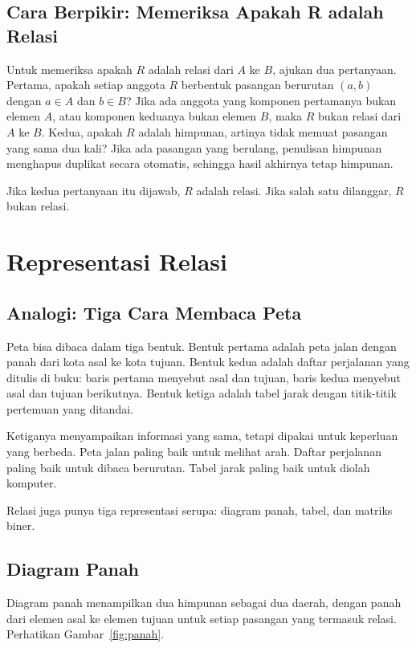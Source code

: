 \documentclass[11pt,a4paper]{article}
\begin{document}
\subsection{Cara Berpikir: Memeriksa Apakah R adalah Relasi}

Untuk memeriksa apakah $R$ adalah relasi dari $A$ ke $B$, ajukan dua pertanyaan. Pertama, apakah setiap anggota $R$ berbentuk pasangan berurutan $(a,b)$ dengan $a \in A$ dan $b \in B$? Jika ada anggota yang komponen pertamanya bukan elemen $A$, atau komponen keduanya bukan elemen $B$, maka $R$ bukan relasi dari $A$ ke $B$. Kedua, apakah $R$ adalah himpunan, artinya tidak memuat pasangan yang sama dua kali? Jika ada pasangan yang berulang, penulisan himpunan menghapus duplikat secara otomatis, sehingga hasil akhirnya tetap himpunan.

Jika kedua pertanyaan itu dijawab, $R$ adalah relasi. Jika salah satu dilanggar, $R$ bukan relasi.

\section{Representasi Relasi}

\subsection{Analogi: Tiga Cara Membaca Peta}

Peta bisa dibaca dalam tiga bentuk. Bentuk pertama adalah peta jalan dengan panah dari kota asal ke kota tujuan. Bentuk kedua adalah daftar perjalanan yang ditulis di buku: baris pertama menyebut asal dan tujuan, baris kedua menyebut asal dan tujuan berikutnya. Bentuk ketiga adalah tabel jarak dengan titik-titik pertemuan yang ditandai.

Ketiganya menyampaikan informasi yang sama, tetapi dipakai untuk keperluan yang berbeda. Peta jalan paling baik untuk melihat arah. Daftar perjalanan paling baik untuk dibaca berurutan. Tabel jarak paling baik untuk diolah komputer.

Relasi juga punya tiga representasi serupa: diagram panah, tabel, dan matriks biner.

\subsection{Diagram Panah}

Diagram panah menampilkan dua himpunan sebagai dua daerah, dengan panah dari elemen asal ke elemen tujuan untuk setiap pasangan yang termasuk relasi. Perhatikan Gambar~\ref{fig:panah}.
\end{document}
